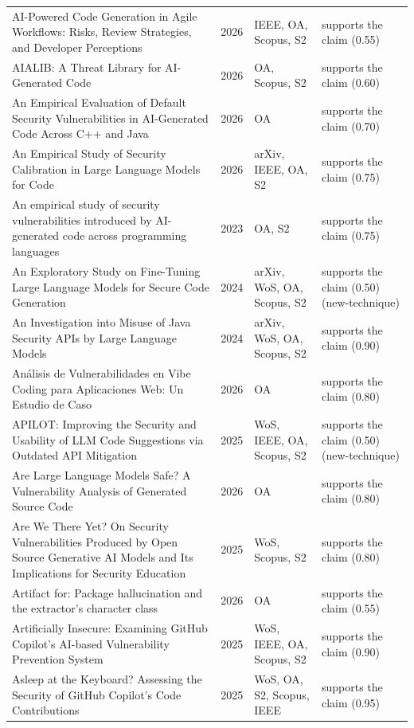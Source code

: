 \begin{longtable}{@{}%
  >{\raggedright\arraybackslash}p{}c%
  >{\raggedright\arraybackslash}p{}%
  >{\raggedright\arraybackslash}p{}@{}}
AI-Powered Code Generation in Agile Workflows: Risks, Review Strategies, and Developer Perceptions & 2026 & IEEE, OA, Scopus, S2 & supports the claim (0.55) \\
AIALIB: A Threat Library for AI-Generated Code & 2026 & OA, Scopus, S2 & supports the claim (0.60) \\
An Empirical Evaluation of Default Security Vulnerabilities in AI-Generated Code Across C++ and Java & 2026 & OA & supports the claim (0.70) \\
An Empirical Study of Security Calibration in Large Language Models for Code & 2026 & arXiv, IEEE, OA, S2 & supports the claim (0.75) \\
An empirical study of security vulnerabilities introduced by AI-generated code across programming languages & 2023 & OA, S2 & supports the claim (0.75) \\
An Exploratory Study on Fine-Tuning Large Language Models for Secure Code Generation & 2024 & arXiv, WoS, OA, Scopus, S2 & supports the claim (0.50) (new-technique) \\
An Investigation into Misuse of Java Security APIs by Large Language Models & 2024 & arXiv, WoS, OA, Scopus, S2 & supports the claim (0.90) \\
Análisis de Vulnerabilidades en Vibe Coding para Aplicaciones Web: Un Estudio de Caso & 2026 & OA & supports the claim (0.80) \\
APILOT: Improving the Security and Usability of LLM Code Suggestions via Outdated API Mitigation & 2025 & WoS, IEEE, OA, Scopus, S2 & supports the claim (0.50) (new-technique) \\
Are Large Language Models Safe? A Vulnerability Analysis of Generated Source Code & 2026 & OA & supports the claim (0.80) \\
Are We There Yet? On Security Vulnerabilities Produced by Open Source Generative AI Models and Its Implications for Security Education & 2025 & WoS, Scopus, S2 & supports the claim (0.80) \\
Artifact for: Package hallucination and the extractor's character class & 2026 & OA & supports the claim (0.55) \\
Artificially Insecure: Examining GitHub Copilot's AI-based Vulnerability Prevention System & 2025 & WoS, IEEE, OA, Scopus, S2 & supports the claim (0.90) \\
Asleep at the Keyboard? Assessing the Security of GitHub Copilot's Code Contributions & 2025 & WoS, OA, S2, Scopus, IEEE & supports the claim (0.95) \\

\end{longtable}
